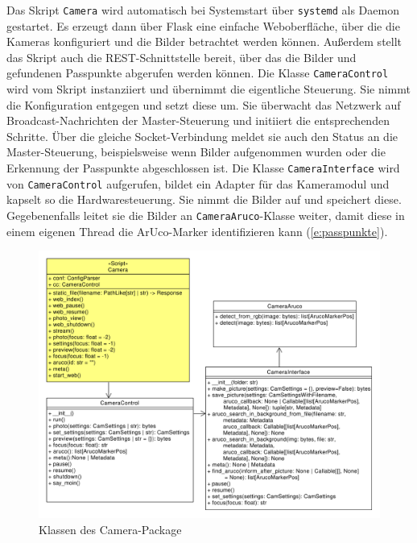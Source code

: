 \documentclass[./00PhotoBox.tex]{subfiles}
\begin{document}
Das Skript \texttt{Camera} wird automatisch bei Systemstart über \texttt{systemd} als Daemon gestartet. Es erzeugt dann über Flask eine einfache Weboberfläche, über die die Kameras konfiguriert und die Bilder betrachtet werden können. Außerdem stellt das Skript auch die \Gls{REST}-Schnittstelle bereit, über das die Bilder und gefundenen Passpunkte abgerufen werden können. Die Klasse \texttt{CameraControl} wird vom Skript instanziiert und übernimmt die eigentliche Steuerung. Sie nimmt die Konfiguration entgegen und setzt diese um. Sie überwacht das Netzwerk auf Broadcast-Nachrichten der Master-Steuerung und initiiert die entsprechenden Schritte.  Über die gleiche \Gls{Socket}-Verbindung meldet sie auch den Status an die Master-Steuerung, beispielsweise wenn Bilder aufgenommen wurden oder die Erkennung der Passpunkte abgeschlossen ist. Die Klasse \texttt{CameraInterface} wird von \texttt{CameraControl} aufgerufen, bildet ein Adapter für das Kameramodul und kapselt so die Hardwaresteuerung. Sie nimmt die Bilder auf und speichert diese. Gegebenenfalls leitet sie die Bilder an \texttt{CameraAruco}-Klasse weiter, damit diese in einem eigenen Thread die ArUco-Marker identifizieren kann (\autoref{e:passpunkte}).

\begin{figure}
    \centering
    \includegraphics[width=1\textwidth]{./img/uml/uml_camera_classdiagramm.pdf}
    \caption{Klassen des Camera-Package} %
    \label{img:uml_camera} %
\end{figure}
\end{document}
